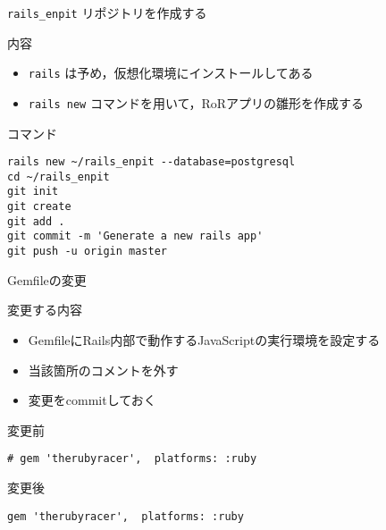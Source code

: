 \documentclass[t, aspectratio=169]{beamer}
\begin{document}
\begin{frame}[fragile,label=sec-6-1-4]{\texttt{rails\_enpit} リポジトリを作成する}
 \begin{block}{内容}
\begin{itemize}
\item \texttt{rails} は予め，仮想化環境にインストールしてある
\item \texttt{rails new} コマンドを用いて，RoRアプリの雛形を作成する
\end{itemize}
\end{block}

\begin{block}{コマンド}
\begin{verbatim}
rails new ~/rails_enpit --database=postgresql
cd ~/rails_enpit
git init
git create
git add .
git commit -m 'Generate a new rails app'
git push -u origin master
\end{verbatim}
\end{block}
\end{frame}
\begin{frame}[fragile,label=sec-6-1-5]{Gemfileの変更}
 \begin{block}{変更する内容}
\begin{itemize}
\item GemfileにRails内部で動作するJavaScriptの実行環境を設定する
\item 当該箇所のコメントを外す
\item 変更をcommitしておく
\end{itemize}
\end{block}

\begin{block}{変更前}
\begin{verbatim}
# gem 'therubyracer',  platforms: :ruby
\end{verbatim}
\end{block}
\begin{block}{変更後}
\begin{verbatim}
gem 'therubyracer',  platforms: :ruby
\end{verbatim}
\end{block}
\end{frame}
\end{document}
